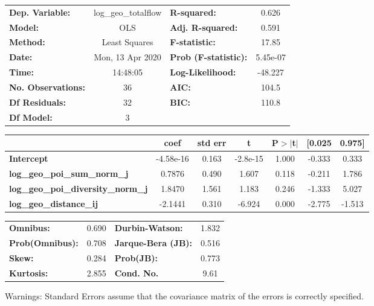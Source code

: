 \begin{center}
\begin{tabular}{lclc}
\toprule
\textbf{Dep. Variable:}                    & log\_geo\_totalflow & \textbf{  R-squared:         } &     0.626   \\
\textbf{Model:}                            &         OLS         & \textbf{  Adj. R-squared:    } &     0.591   \\
\textbf{Method:}                           &    Least Squares    & \textbf{  F-statistic:       } &     17.85   \\
\textbf{Date:}                             &   Mon, 13 Apr 2020  & \textbf{  Prob (F-statistic):} &  5.45e-07   \\
\textbf{Time:}                             &       14:48:05      & \textbf{  Log-Likelihood:    } &   -48.227   \\
\textbf{No. Observations:}                 &            36       & \textbf{  AIC:               } &     104.5   \\
\textbf{Df Residuals:}                     &            32       & \textbf{  BIC:               } &     110.8   \\
\textbf{Df Model:}                         &             3       & \textbf{                     } &             \\
\bottomrule
\end{tabular}
\begin{tabular}{lcccccc}
                                           & \textbf{coef} & \textbf{std err} & \textbf{t} & \textbf{P$> |$t$|$} & \textbf{[0.025} & \textbf{0.975]}  \\
\midrule
\textbf{Intercept}                         &    -4.58e-16  &        0.163     &  -2.8e-15  &         1.000        &       -0.333    &        0.333     \\
\textbf{log\_geo\_poi\_sum\_norm\_j}       &       0.7876  &        0.490     &     1.607  &         0.118        &       -0.211    &        1.786     \\
\textbf{log\_geo\_poi\_diversity\_norm\_j} &       1.8470  &        1.561     &     1.183  &         0.246        &       -1.333    &        5.027     \\
\textbf{log\_geo\_distance\_ij}            &      -2.1441  &        0.310     &    -6.924  &         0.000        &       -2.775    &       -1.513     \\
\bottomrule
\end{tabular}
\begin{tabular}{lclc}
\textbf{Omnibus:}       &  0.690 & \textbf{  Durbin-Watson:     } &    1.832  \\
\textbf{Prob(Omnibus):} &  0.708 & \textbf{  Jarque-Bera (JB):  } &    0.516  \\
\textbf{Skew:}          &  0.284 & \textbf{  Prob(JB):          } &    0.773  \\
\textbf{Kurtosis:}      &  2.855 & \textbf{  Cond. No.          } &     9.61  \\
\bottomrule
\end{tabular}
\end{center}

Warnings: \newline
 [1] Standard Errors assume that the covariance matrix of the errors is correctly specified.